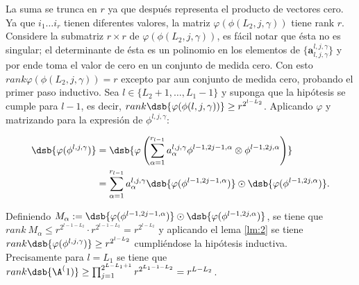 La suma se trunca en $r$ ya que después representa el producto de vectores cero. Ya que $ i_1\dots i_r $
tienen diferentes valores, la matriz $ \varphi(\phi(L_2,j, \gamma)) $ tiene rank $r$. Considere la submatriz $r\times r$ de $\varphi(\phi(L_2,j, \gamma))$, es fácil notar que ésta no es singular; el determinante de ésta es un polinomio en los elementos de $ \{ \textbf{a}^{l,j,\gamma}_{l,j,\gamma} \} $ y por ende toma el valor de cero en un conjunto de medida cero. Con esto $ rank \varphi(\phi(L_2,j, \gamma)) = r$ excepto par aun conjunto de medida cero, probando el primer paso inductivo. Sea $ l\in \{L_2+1, \dots,L_1-1\} $ y suponga que la hipótesis se cumple para $l-1$, es decir, $rank \dsb{\varphi(\phi(l,j, \gamma))} \geq r^{2^{l-L_2}} $. Aplicando $\varphi$ y matrizando para la expresión de $ \phi^{l,j,\gamma} $:

\begin{equation}
\begin{split}
	\dsb{\varphi(\phi^{l,j,\gamma})} 
	&= \dsb{\varphi
	\left( \sum_{\alpha=1}^{r_{l-1}}
	a_\alpha^{l,j,\gamma} \phi^{l-1,2j-1,\alpha} \otimes \phi^{l-1,2j,\alpha}  \right)}\\
	&=  \sum_{\alpha=1}^{r_{l-1}}
		a_\alpha^{l,j,\gamma} \dsb{\varphi
		(\phi^{l-1,2j-1,\alpha})} \odot \dsb{ \varphi(\phi^{l-1,2j,\alpha} )}.
\end{split}
\end{equation}

Definiendo $ M_\alpha := \dsb{\varphi(\phi^{l-1,2j-1,\alpha})} \odot \dsb{ \varphi(\phi^{l-1,2j,\alpha} )} $, se tiene que $rank\ M_\alpha \leq r^{2^{l-1-L_2}} \cdot r^{2^{l-1-L_2}} = r^{2^{l-L_2}} $ y aplicando el lema \autoref{lm:2} se tiene $rank  \dsb{\varphi(\phi^{l,j,\gamma})}  \geq r^{2^{l-L_2}} $ cumpliéndose la hipótesis inductiva.\\

Precisamente para  $ l=L_1 $ se tiene que $ rank \dsb{\A^(1)}  \geq \prod_{j=1}^{2^{L-L_1+1}} r^{2^{L_1-1-L_2}} = r^{L-L_2} $.

